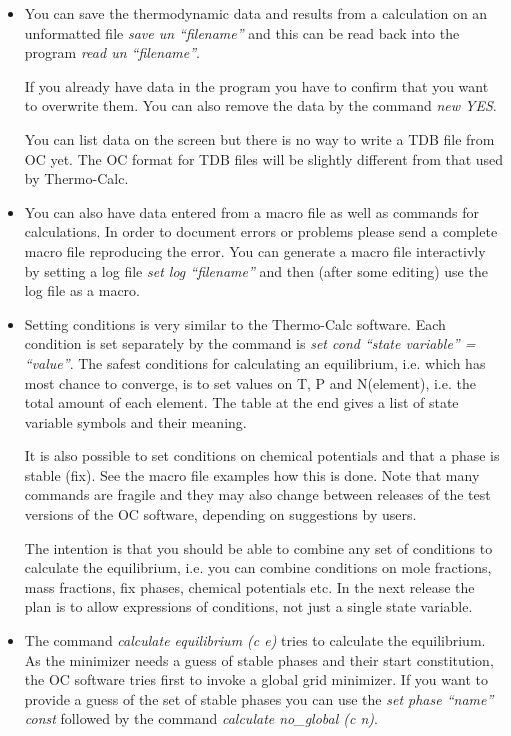 \documentclass[12pt]{article}
\begin{document}
\begin{itemize}
\item You can save the thermodynamic data and results from a
calculation on an unformatted file {\em save un ``filename''}
and this can be read back into the program {\em read un ``filename''}.

If you already have data in the program you have to confirm that you
want to overwrite them.  You can also remove the data by the command
{\em new YES}.

You can list data on the screen but there is no way to write a TDB
file from OC yet.  The OC format for TDB files will be slightly
different from that used by Thermo-Calc.

\item You can also have data entered from a macro file as well as
commands for calculations.  In order to document errors or problems
please send a complete macro file reproducing the error.  You can
generate a macro file interactivly by setting a log file {\em set log
``filename''} and then (after some editing) use the log file as a
macro.

\item Setting conditions is very similar to the Thermo-Calc software.
Each condition is set separately by the command is {\em set cond
``state variable'' = ``value''}.  The safest conditions for
calculating an equilibrium, i.e. which has most chance to converge, is
to set values on T, P and N(element), i.e. the total amount of each
element.  The table at the end gives a list of state variable symbols
and their meaning.

It is also possible to set conditions on chemical potentials and that
a phase is stable (fix).  See the macro file examples how this is
done.  Note that many commands are fragile and they may also change
between releases of the test versions of the OC software, depending on
suggestions by users.

The intention is that you should be able to combine any set of
conditions to calculate the equilibrium, i.e. you can combine
conditions on mole fractions, mass fractions, fix phases, chemical
potentials etc.  In the next release the plan is to allow expressions
of conditions, not just a single state variable.

\item The command {\em calculate equilibrium (c e)} tries to calculate
the equilibrium.  As the minimizer needs a guess of stable phases and
their start constitution, the OC software tries first to invoke a
global grid minimizer.  If you want to provide a guess of the set of
stable phases you can use the {\em set phase ``name'' const} followed
by the command {\em calculate no\_global (c n)}.


\end{itemize}
\end{document}
